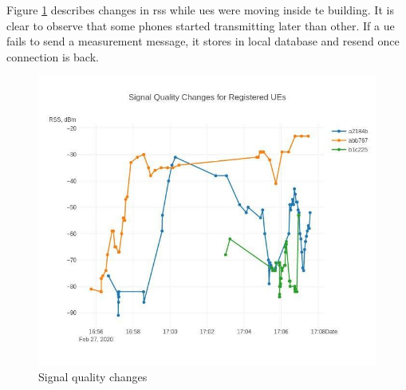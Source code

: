 Figure \ref{fig:signal-quality-changes} describes changes in \acrshort{rss} while \glspl{ue} were moving inside te building. It is clear to observe that some phones started transmitting later than other. If a \gls{ue} fails to send a measurement message, it stores in local database and resend once connection is back.


\begin{figure}[H]
	\centering
	\includegraphics[width=0.7\linewidth,keepaspectratio]{images/experiment_3_3.jpg}
\caption{Signal quality changes}
\label{fig:signal-quality-changes}
\end{figure}
